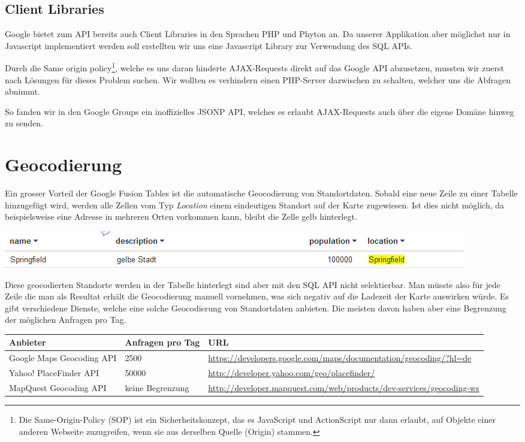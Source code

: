 \subsection{Client Libraries}
Google bietet zum API bereits auch Client Libraries in den Sprachen PHP und Phyton an. Da unserer Applikation aber möglichst nur in Javascript implementiert werden soll erstellten wir uns eine Javascript Library zur Verwendung des SQL APIs.

Durch die Same origin policy\footnote{Die Same-Origin-Policy (SOP) ist ein Sicherheitskonzept, das es JavaScript und ActionScript nur dann erlaubt, auf Objekte einer anderen Webseite zuzugreifen, wenn sie aus derselben Quelle (Origin) stammen.\cite{sop} }, welche es uns daran hinderte AJAX-Requests direkt auf das Google API abzusetzen, mussten wir zuerst nach Lösungen für dieses Problem suchen. Wir wollten es verhindern einen PHP-Server dazwischen zu schalten, welcher uns die Abfragen abnimmt.

So fanden wir in den Google Groups ein inoffizielles JSONP API, welches es erlaubt AJAX-Requests auch über die eigene Domäne hinweg zu senden.

\section{Geocodierung}
Ein grosser Vorteil der Google Fusion Tables ist die automatische 
\gls{Geocodierung} von Standortdaten. Sobald eine neue Zeile zu einer Tabelle hinzugefügt wird, werden alle Zellen vom Typ \emph{Location} einem eindeutigen Standort auf der Karte zugewiesen. Ist dies nicht möglich, da beispielsweise eine Adresse in mehreren Orten vorkommen kann, bleibt die Zelle gelb hinterlegt.
 
\includegraphics[scale=0.75]{images/geocoding_failed.png}

Diese geocodierten Standorte werden in der Tabelle hinterlegt sind aber mit den SQL API nicht selektierbar. Man müsste also für jede Zeile die man als Resultat erhält die Geocodierung manuell vornehmen, was sich negativ auf die Ladezeit der Karte auswirken würde.
Es gibt verschiedene Dienste, welche eine solche Geocodierung von Standortdaten anbieten. Die meisten davon haben aber eine Begrenzung der möglichen Anfragen pro Tag.

\begin{tabular}{|l|p{1.9cm}|p{7.3cm}|}
\hline 
Anbieter & Anfragen pro Tag & URL \\ 
\hline 
Google Maps Geocoding API & 2500 & \url{https://developers.google.com/maps/documentation/geocoding/?hl=de} \\ 
\hline 
Yahoo! PlaceFinder API & 50000 & \url{http://developer.yahoo.com/geo/placefinder/} \\ 
\hline 
MapQuest Geocoding API & keine Begrenzung & \url{http://developer.mapquest.com/web/products/dev-services/geocoding-ws} \\ 
\hline 
\end{tabular} 

